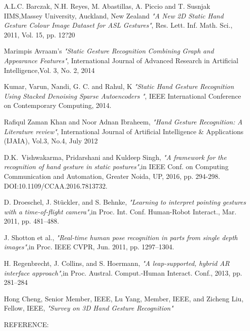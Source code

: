 \documentclass[conference]{IEEEtran}
\begin{document}
\begin{thebibliography}{1}
A.L.C. Barczak, N.H. Reyes, M. Abastillas, A. Piccio and T. Susnjak IIMS,Massey University, Auckland, New Zealand  \emph{"A New 2D Static Hand Gesture Colour Image Dataset for ASL Gestures"}, Res. Lett. Inf. Math. Sci., 2011, Vol. 15, pp. 12?20

Marimpis Avraam’s  \emph{"Static Gesture Recognition Combining Graph and Appearance Features"}, International Journal of Advanced Research in Artificial Intelligence,Vol. 3, No. 2, 2014


Kumar, Varun, Nandi, G. C. and Rahul, K \emph{"Static Hand Gesture
Recognition Using Stacked Denoising Sparse Autoencoders
"}, IEEE International Conference on Contemporary Computing, 2014.


Rafiqul Zaman Khan and Noor Adnan Ibraheem, \emph{"Hand Gesture Recognition:   A Literature review"}, International Journal of Artificial Intelligence \& Applications (IJAIA), Vol.3, No.4, July 2012


D.K.~Vishwakarma, Pridarshani and  Kuldeep Singh,  \emph{"A framework for the recognition of hand gesture in static postures"},in IEEE Conf. on Computing Communication and Automation, Greater Noida, UP, 2016, pp. 294-298. DOI:10.1109/CCAA.2016.7813732.

D. Droeschel, J. Stückler, and S. Behnke,  \emph{"Learning to interpret
pointing gestures with a time-of-flight camera"},in Proc. Int. Conf.
Human-Robot Interact., Mar. 2011, pp. 481–488.

J. Shotton et al.,  \emph{"Real-time human pose recognition in parts from
single depth images"},in Proc. IEEE CVPR, Jun. 2011, pp. 1297–1304.

H. Regenbrecht, J. Collins, and S. Hoermann,  \emph{"A leap-supported,
hybrid AR interface approach"},in Proc. Austral. Comput.-Human
Interact. Conf., 2013, pp. 281–284

Hong Cheng, Senior Member, IEEE, Lu Yang, Member, IEEE, and Zicheng Liu, Fellow, IEEE,  \emph{"Survey on 3D Hand Gesture Recognition"}

REFERENCE:



\end{thebibliography}




\end{document}
